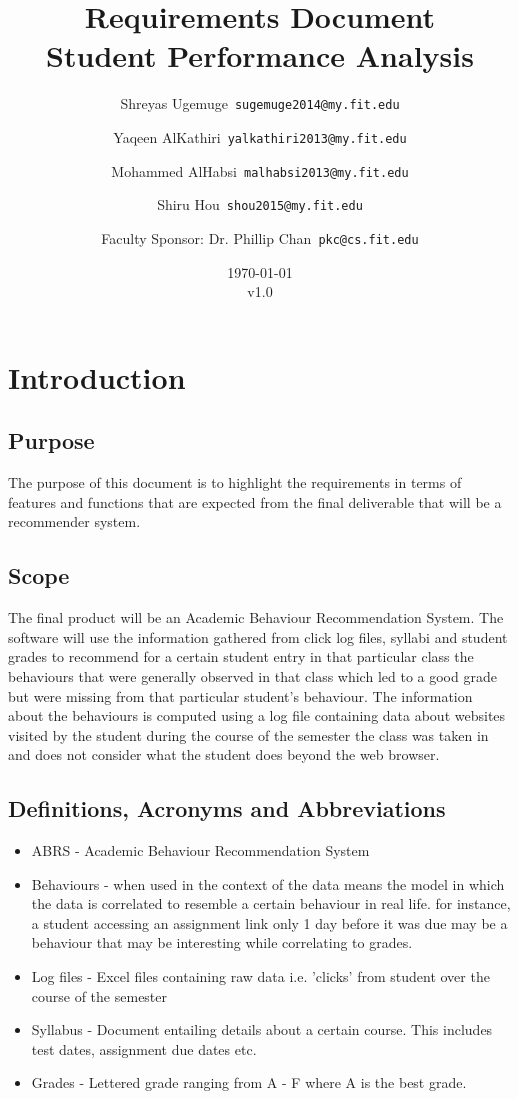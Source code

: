 \documentclass[12pt]{article}
\title{\textbf{Requirements Document} \\ \hfill \break
	Student Performance Analysis}
\author{Shreyas Ugemuge\      \texttt{sugemuge2014@my.fit.edu}
  \and
  Yaqeen AlKathiri\      \texttt{yalkathiri2013@my.fit.edu}
  \and
	Mohammed AlHabsi\      \texttt{malhabsi2013@my.fit.edu}
  \and
  Shiru Hou\      \texttt{shou2015@my.fit.edu}
  \and
  Faculty Sponsor: Dr. Phillip Chan\      \texttt{pkc@cs.fit.edu}}
\date{\today \\ v1.0}
\begin{document}
	\singlespacing
	\maketitle \pagebreak \tableofcontents \pagebreak
	\section{Introduction}
	\subsection{Purpose} \label{purpose}
	The purpose of this document is to highlight the requirements in terms of features and functions that are expected from the final deliverable that will be a recommender system. 
	\subsection{Scope} \label{scope}
	The final product will be an Academic Behaviour Recommendation System. The software will use the information gathered from click log files, syllabi and student grades to recommend for a certain student entry in that particular class the behaviours that were generally observed in that class which led to a good grade but were missing from that particular student's behaviour. The information about the behaviours is computed using a log file containing data about websites visited by the student during the course of the semester the class was taken in and does not consider what the student does beyond the web browser.
	\subsection{Definitions, Acronyms and Abbreviations} \label{defs}
	\begin{itemize}
		\item ABRS - Academic Behaviour Recommendation System
		\item Behaviours - when used in the context of the data means the model in which the data is correlated to resemble a certain behaviour in real life. for instance, a student accessing an assignment link only 1 day before it was due may be a behaviour that may be interesting while correlating to grades. 
		\item Log files - Excel files containing raw data i.e. 'clicks' from student over the course of the semester
		\item Syllabus - Document entailing details about a certain course. This includes test dates, assignment due dates etc.
		\item Grades - Lettered grade ranging from A - F where A is the best grade.
	\end{itemize}
\end{document}
